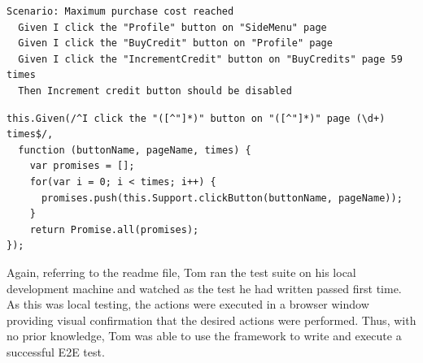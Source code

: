 \begin{listing}[H]
\begin{verbatim}
Scenario: Maximum purchase cost reached
  Given I click the "Profile" button on "SideMenu" page
  Given I click the "BuyCredit" button on "Profile" page
  Given I click the "IncrementCredit" button on "BuyCredits" page 59 times
  Then Increment credit button should be disabled
\end{verbatim}
\label{lst:toms-first-test}
\end{listing}

\begin{listing}[H]
\begin{verbatim}
this.Given(/^I click the "([^"]*)" button on "([^"]*)" page (\d+) times$/,
  function (buttonName, pageName, times) {
    var promises = [];
    for(var i = 0; i < times; i++) {
      promises.push(this.Support.clickButton(buttonName, pageName));
    }
    return Promise.all(promises);
});
\end{verbatim}
\label{lst:additional-step-method}
\end{listing}

Again, referring to the readme file, Tom ran the test suite on his local development machine and watched as the test he had written passed first time. As this was local testing, the actions were executed in a browser window providing visual confirmation that the desired actions were performed. Thus, with no prior knowledge, Tom was able to use the framework to write and execute a successful E2E test.

